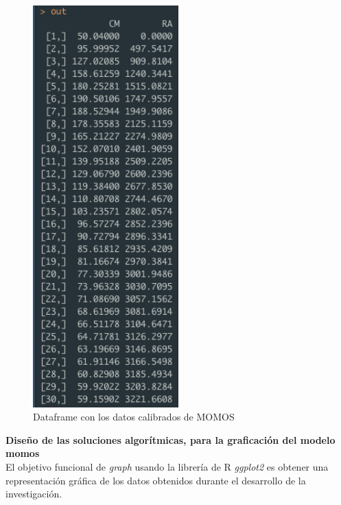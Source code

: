 \begin{figure}[H]
  \centering
    \begin{minipage}{0.5\textwidth}
      \centering
      \includegraphics[width=0.5\textwidth]{figure_4_13.png}
      \caption{Dataframe con los datos calibrados de MOMOS}
      \label{fig:Fig}
    \end{minipage}%
    \hspace{5mm}
\end{figure}

\noindent
\textbf{Diseño de las soluciones algor\'itmicas, para la graficaci\'on del modelo momos}\\

El objetivo funcional de \textit{graph} usando la librer\'ia de R \textit{ggplot2} es obtener una representaci\'on gr\'afica de los datos obtenidos durante el desarrollo de la investigaci\'on.\\

